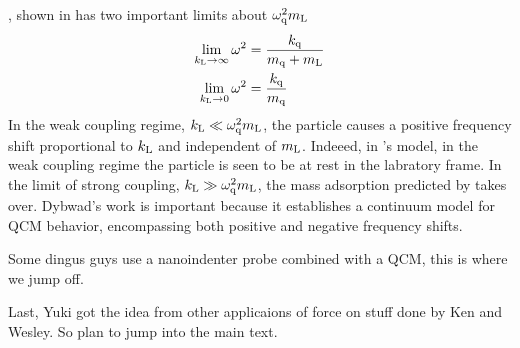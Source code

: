 , shown in  has two
important limits about $\omega_\mathrm{q}^2 m_\mathrm{L}$
\begin{align}
 \lim_{k_\mathrm{L}\to\infty} \omega^2 &= \frac{k_\mathrm{q}}{m_\mathrm{q}+m_\mathrm{L}}\\
 \lim_{k_\mathrm{L}\to0} \omega^2 &= \frac{k_\mathrm{q}}{m_\mathrm{q}}
\end{align}
In the weak coupling regime, $k_\mathrm{L}\ll\omega_\mathrm{q}^2m_\mathrm{L}$, the particle causes a
positive frequency shift proportional to $k_\mathrm{L}$ and independent of $m_\mathrm{L}$.
Indeeed, in 's model, in the weak coupling regime the
particle is seen to be at rest in the labratory frame. In the limit of strong
coupling, $k_\mathrm{L}\gg\omega_\mathrm{q}^2m_\mathrm{L}$, the mass adsorption predicted by
 takes over.  Dybwad's work is important because it
establishes a continuum model for QCM behavior, encompassing both positive
and negative frequency shifts.

Some dingus guys use a nanoindenter probe combined with a QCM, this is
where we jump off.

Last, Yuki got the idea from other applicaions of force on stuff done by
Ken and Wesley.  So plan to jump into the main text.

